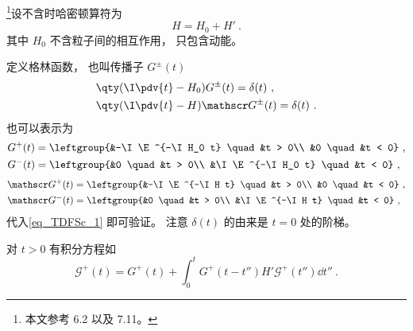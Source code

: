 
\footnote{本文参考 \cite{Newton} 6.2 以及 \cite{Sakurai} 7.11。}设不含时哈密顿算符为
\begin{equation}
H = H_0 + H'~.
\end{equation}
其中 $H_0$ 不含粒子间的相互作用， 只包含动能。

定义格林函数， 也叫传播子 $G^\pm(t)$
\begin{equation}\label{eq_TDFSc_1}
\begin{aligned}
&\qty(\I\pdv{t} - H_0)G^\pm (t) = \delta(t)~,\\
&\qty(\I\pdv{t} - H)\mathscr G^\pm (t) = \delta(t)~.
\end{aligned}
\end{equation}
也可以表示为
\begin{equation}
\begin{aligned}
&G^+(t) = \leftgroup{&-\I \E^{-\I H_0 t} \quad &t > 0\\
&0 \quad &t < 0}~,\\
&G^-(t) = \leftgroup{&0 \quad &t > 0\\
&\I \E^{-\I H_0 t} \quad &t < 0}~,
\end{aligned}
\end{equation}
\begin{equation}
\begin{aligned}
&\mathscr G^+(t) = \leftgroup{&-\I \E^{-\I H t} \quad &t > 0\\
&0 \quad &t < 0}~,\\
&\mathscr G^-(t) = \leftgroup{&0 \quad &t > 0\\
&\I \E^{-\I H t} \quad &t < 0}~,
\end{aligned}
\end{equation}
代入\autoref{eq_TDFSc_1} 即可验证。 注意 $\delta(t)$ 的由来是 $t=0$ 处的阶梯。

对 $t>0$ 有积分方程如
\begin{equation}
\mathscr G^+(t) = G^+(t) + \int_0^t G^+(t-t'')H'\mathscr G^+(t'')\dd{t''}~.
\end{equation}
